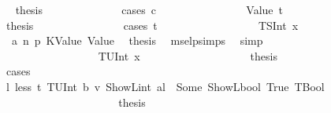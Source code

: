 \begin{isabellebody}
\ \isamarkupfalse%
\ {\isacharquery}{\kern0pt}thesis\isanewline
\ \ \ \ \ \ \ \ \ \ \ \ \isamarkupfalse%
\ {\isacharparenleft}{\kern0pt}cases\ c{\isacharparenright}{\kern0pt}\isanewline
\ \ \ \ \ \ \ \ \ \ \ \ \ \ \isamarkupfalse%
\ {\isacharparenleft}{\kern0pt}Value\ t{\isacharprime}{\kern0pt}{\isacharparenright}{\kern0pt}\isanewline
\ \ \ \ \ \ \ \ \ \ \ \ \ \ \isamarkupfalse%
\ \isamarkupfalse%
\ {\isacharquery}{\kern0pt}thesis\isanewline
\ \ \ \ \ \ \ \ \ \ \ \ \ \ \isamarkupfalse%
\ {\isacharparenleft}{\kern0pt}cases\ t{\isacharprime}{\kern0pt}{\isacharparenright}{\kern0pt}\isanewline
\ \ \ \ \ \ \ \ \ \ \ \ \ \ \ \ \isamarkupfalse%
\ {\isacharparenleft}{\kern0pt}TSInt\ x{}{\isacharparenright}{\kern0pt}\isanewline
\ \ \ \ \ \ \ \ \ \ \ \ \ \ \ \ \ \isamarkupfalse%
\ {}\ a{}\ n\ p{}\ KValue\ Value\ \isamarkupfalse%
\ {\isacharquery}{\kern0pt}thesis\ \isamarkupfalse%
\ msel{\isachardot}{\kern0pt}psimps{\isacharparenleft}{\kern0pt}{}{\isacharparenright}{\kern0pt}\ \isamarkupfalse%
\ simp\isanewline
\ \ \ \ \ \ \ \ \ \ \ \ \ \ \isamarkupfalse%
\isanewline
\ \ \ \ \ \ \ \ \ \ \ \ \ \ \ \ \isamarkupfalse%
\ {\isacharparenleft}{\kern0pt}TUInt\ x{}{\isacharparenright}{\kern0pt}\isanewline
\ \ \ \ \ \ \ \ \ \ \ \ \ \ \ \ \isamarkupfalse%
\ \isamarkupfalse%
\ {\isacharquery}{\kern0pt}thesis\isanewline
\ \ \ \ \ \ \ \ \ \ \ \ \ \ \ \ \isamarkupfalse%
\ {\isacharparenleft}{\kern0pt}cases{\isacharparenright}{\kern0pt}\isanewline
\ \ \ \ \ \ \ \ \ \ \ \ \ \ \ \ \ \ \isamarkupfalse%
\ l{\isacharcolon}{\kern0pt}\ {\isachardoublequoteopen}less\ t{\isacharprime}{\kern0pt}\ {\isacharparenleft}{\kern0pt}TUInt\ b{}{}{}{\isacharparenright}{\kern0pt}\ v\ {\isacharparenleft}{\kern0pt}ShowL\isactrlsub i\isactrlsub n\isactrlsub t\ al{\isacharparenright}{\kern0pt}\ {\isacharequal}{\kern0pt}\ Some\ {\isacharparenleft}{\kern0pt}ShowL\isactrlsub b\isactrlsub o\isactrlsub o\isactrlsub l\ True{\isacharcomma}{\kern0pt}\ TBool{\isacharparenright}{\kern0pt}{\isachardoublequoteclose}\isanewline
\ \ \ \ \ \ \ \ \ \ \ \ \ \ \ \ \ \ \isamarkupfalse%
\ \isamarkupfalse%
\ {\isacharquery}{\kern0pt}thesis\isanewline
\ \ \ \ \ \ \ \ \ \ \ \ \ \ \ \ \ \ \isamarkupfalse%

\end{isabellebody}
